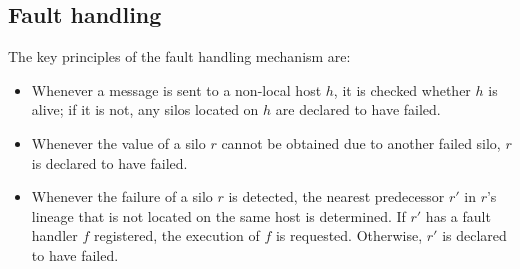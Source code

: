 \documentclass[preprint]{sigplanconf}
\theoremstyle{definition}
\theoremstyle{definition}
\begin{document}

\subsection{Fault handling}\label{sec:faults-opsem}

The key principles of the fault handling mechanism are:
\begin{itemize}
\item Whenever a message is sent to a non-local host $h$, it is checked whether $h$ is alive; if it is not, any silos located on $h$ are declared to have failed.
\item Whenever the value of a silo $r$ cannot be obtained due to another failed silo, $r$ is declared to have failed.
\item Whenever the failure of a silo $r$ is detected, the nearest predecessor $r'$ in $r$'s lineage that is not located on the same host is determined. If $r'$ has a fault handler $f$ registered, the execution of $f$ is requested. Otherwise, $r'$ is declared to have failed.
\end{itemize}


\end{document}
